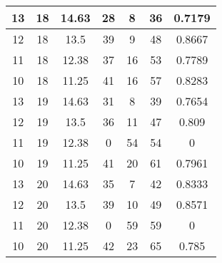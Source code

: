 \documentclass[letterpaper, 12pt]{article}
\begin{document}
\begin{longtable}{|c|c|c|c|c|c|c|}
\hline
13 & 18 & 14.63 & 28 & 8 & 36 & 0.7179 \\
\hline
12 & 18 & 13.5 & 39 & 9 & 48 & 0.8667 \\
\hline
11 & 18 & 12.38 & 37 & 16 & 53 & 0.7789 \\
\hline
10 & 18 & 11.25 & 41 & 16 & 57 & 0.8283 \\
\hline
13 & 19 & 14.63 & 31 & 8 & 39 & 0.7654 \\
\hline
12 & 19 & 13.5 & 36 & 11 & 47 & 0.809 \\
\hline
11 & 19 & 12.38 & 0 & 54 & 54 & 0 \\
\hline
10 & 19 & 11.25 & 41 & 20 & 61 & 0.7961 \\
\hline
13 & 20 & 14.63 & 35 & 7 & 42 & 0.8333 \\
\hline
12 & 20 & 13.5 & 39 & 10 & 49 & 0.8571 \\
\hline
11 & 20 & 12.38 & 0 & 59 & 59 & 0 \\
\hline
10 & 20 & 11.25 & 42 & 23 & 65 & 0.785 \\
\hline
\end{longtable}
\end{document}
